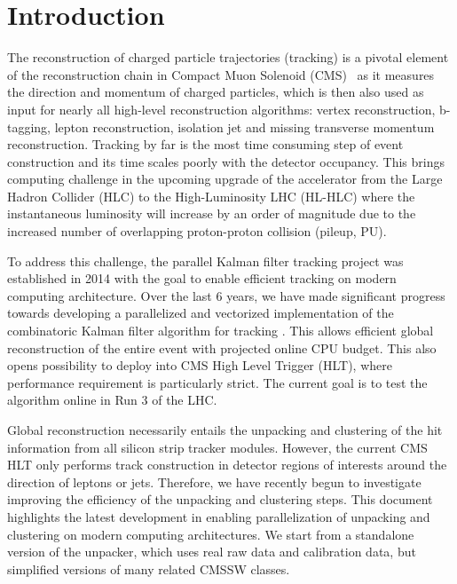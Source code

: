 \documentclass[10pt, paper=a4, UKenglish]{article}
\begin{document}
\normalsize 


\section{Introduction}
\label{intro}
The reconstruction of charged particle trajectories (tracking) is a pivotal element of the reconstruction chain in Compact Muon Solenoid (CMS)~\cite{Chatrchyan:2008aa} as it measures the direction and momentum of charged particles, which is then also used as input for nearly all high-level reconstruction algorithms: vertex reconstruction, b-tagging, lepton reconstruction, isolation jet and missing transverse momentum reconstruction. Tracking by far is the most time consuming step of event construction and its time scales poorly with the detector occupancy. This brings computing challenge in the upcoming upgrade of the accelerator from the Large Hadron Collider (HLC) to the High-Luminosity LHC (HL-HLC) where the instantaneous luminosity will increase by an order of magnitude due to the increased number of overlapping proton-proton collision (pileup, PU). 

To address this challenge, the parallel Kalman filter tracking project \mkFit was established in 2014 with the goal to enable efficient tracking on modern computing architecture. Over the last 6 years, we have made significant progress towards developing a parallelized and vectorized implementation of the combinatoric Kalman filter algorithm for tracking \cite{Cerati_2017,Cerati_2019,2019arXiv190611744C,2020arXiv200206295C}. This allows efficient global reconstruction of the entire event with projected online CPU budget. This also opens possibility to deploy \mkFit into CMS High Level Trigger (HLT), where performance requirement is particularly strict. The current goal is to test the algorithm online in Run 3 of the LHC. 

Global reconstruction necessarily entails the unpacking and clustering of the hit information from all silicon strip tracker modules. However, the current CMS HLT only performs track construction in detector regions of interests around the direction of leptons or jets. Therefore, we have recently begun to investigate improving the efficiency of the unpacking and clustering steps. This document highlights the latest development in enabling parallelization of unpacking and clustering on modern computing architectures. We start from a standalone version of the unpacker, which uses real raw data and calibration data, but simplified versions of many related CMSSW classes. 
\end{document}
